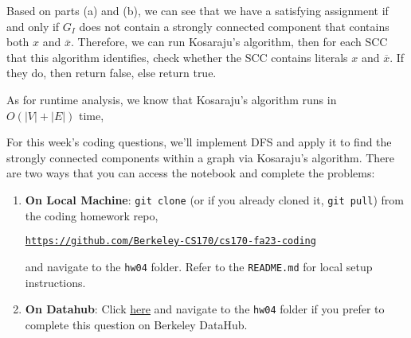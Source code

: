 \documentclass[10.5pt]{article}
\begin{document}
\begin{subparts}
	\begin{solution}
		Based on parts (a) and (b), we can see that we have a satisfying assignment if and only if $G_I$ does 
		not contain a strongly connected component that contains both $x$ and $\overline x$. Therefore, 
		we can run Kosaraju's algorithm, then for each SCC that this algorithm identifies, check whether 
		the SCC contains literals $x$ and $\overline x$. If they do, then return false, else return true.

		As for runtime analysis, we know that Kosaraju's algorithm runs in $O(|V| + |E|)$ time,  
	\end{solution}
\end{subparts}

\pagebreak
{}

For this week’s coding questions, we'll implement DFS and apply it to find the strongly connected components within a graph via Kosaraju's algorithm.  There are two ways that you can access the notebook and complete the problems:
\begin{enumerate}
    \item \textbf{On Local Machine}: \texttt{git clone} (or if you already cloned it, \texttt{git pull}) from the coding homework repo, 
    
    \href{https://github.com/Berkeley-CS170/cs170-fa23-coding}{\texttt{https://github.com/Berkeley-CS170/cs170-fa23-coding}}
    
    and navigate to the \texttt{hw04} folder. Refer to the \texttt{README.md} for local setup instructions.

    \item \textbf{On Datahub}: Click \href{https://datahub.berkeley.edu/hub/user-redirect/git-pull?repo=https%3A%2F%2Fgithub.com%2FBerkeley-CS170%2Fcs170-fa23-coding&urlpath=tree%2Fcs170-fa23-coding%2Fhw04%2Fdfs_scc.ipynb&branch=main}{here} and navigate to the \texttt{hw04} folder if you prefer to complete this question on Berkeley DataHub.
\end{enumerate}
\end{document}
